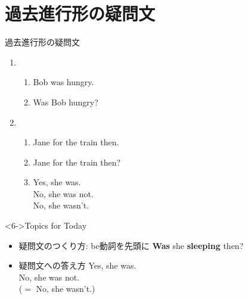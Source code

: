 \documentclass[aspectratio=169,xcolor={dvipsnames,table}]{beamer}
\begin{document}
\section{過去進行形の疑問文}
\begin{frame}[plain]{過去進行形の疑問文}
  \begin{enumerate}
  \item \begin{enumerate}
	 \item<1-> Bob was hungry.
	 \item<2-> Was Bob hungry?
	\end{enumerate}
  \item \begin{enumerate}
	 \item<3-> Jane  for the train then.
	 \item<4->  Jane  for the train then?
	 \item<5-> Yes, she was.\\
                   No, she was not.\\
                   No, she wasn't.
	\end{enumerate}
 \end{enumerate}

\begin{block}<6->{Topics for Today}
\begin{itemize}[square]\small
 \item 疑問文のつくり方: be動詞を先頭に
\hfill{}{{\bfseries Was} she {\bfseries sleeping} then?}
 \item 疑問文への答え方
\hfill{}Yes, she was.\\
\hfill{}No, she was not.\\
\hfill{}($=$ No, she wasn't.)
\end{itemize}
\end{block}

\hfill{}

\end{frame}
\end{document}
